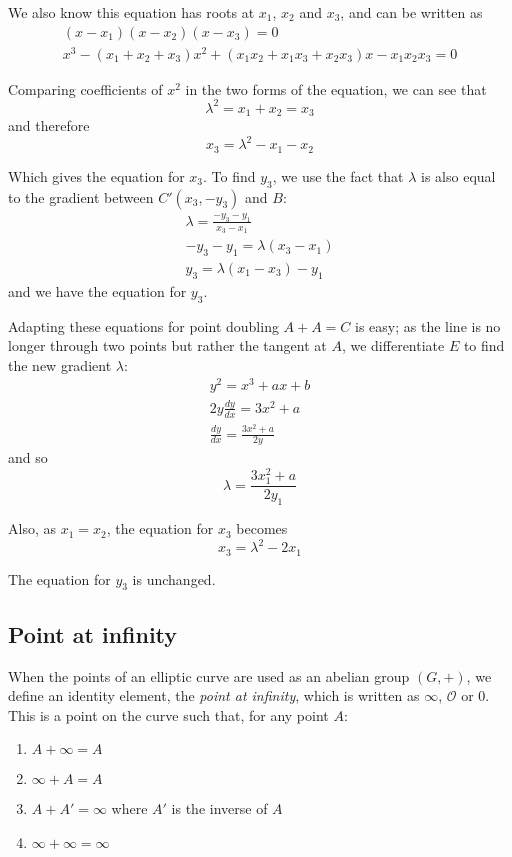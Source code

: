 \documentclass[a4paper]{article}
\begin{document}
We also know this equation has roots at $x_1$, $x_2$ and $x_3$, and can be written as
\begin{align*}
    (x-x_1)(x-x_2)(x-x_3)=0 \\
    x^3 - (x_1 + x_2 + x_3)x^2 + (x_1x_2 + x_1x_3 + x_2x_3)x - x_1x_2x_3 = 0
\end{align*}

Comparing coefficients of $x^2$ in the two forms of the equation, we can see that \[\lambda^2 = x_1 + x_2 = x_3\] and therefore \[x_3 = \lambda^2 - x_1 - x_2\]

Which gives the equation for $x_3$. To find $y_3$, we use the fact that $\lambda$ is also equal to the gradient between $C'(x_3, -y_3)$ and $B$:
\begin{align*}
    \lambda = \frac{-y_3-y_1}{x_3-x_1} \\
    -y_3 - y_1 = \lambda(x_3-x_1) \\
    y_3 = \lambda(x_1-x_3)-y_1
\end{align*}
and we have the equation for $y_3$.

Adapting these equations for point doubling $A + A = C$ is easy; as the line is no longer through two points but rather the tangent at $A$, we differentiate $E$ to find the new gradient $\lambda$:
\begin{align*}
    y^2 = x^3 + ax + b \\
    2y\frac{dy}{dx} = 3x^2 + a \\
    \frac{dy}{dx} = \frac{3x^2 + a}{2y}
\end{align*}
and so \[\lambda = \frac{3x_1^2 + a}{2y_1}\]

Also, as $x_1 = x_2$, the equation for $x_3$ becomes \[x_3 = \lambda^2-2x_1\]

The equation for $y_3$ is unchanged.

\subsection{Point at infinity}

When the points of an elliptic curve are used as an abelian group $(G, +)$, we define an identity element, the \textit{point at infinity}, which is written as $\infty$, $\mathcal{O}$ or $0$. This is a point on the curve such that, for any point $A$:
\begin{enumerate}
    \item $A + \infty = A$
    \item $\infty + A = A$
    \item $A + A' = \infty$ where $A'$ is the inverse of $A$
    \item $\infty + \infty = \infty$
\end{enumerate}
\end{document}
